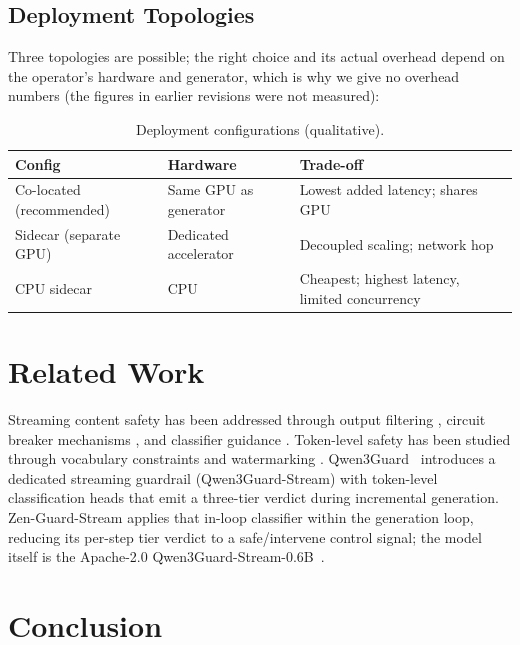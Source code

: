 \documentclass[11pt,a4paper]{article}
\begin{document}
\subsection{Deployment Topologies}

Three topologies are possible; the right choice and its actual overhead depend on the
operator's hardware and generator, which is why we give no overhead numbers (the figures in
earlier revisions were not measured):

\begin{table}[H]
\centering
\caption{Deployment configurations (qualitative).}
\begin{tabular}{lll}
\toprule
\textbf{Config} & \textbf{Hardware} & \textbf{Trade-off} \\
\midrule
Co-located (recommended) & Same GPU as generator & Lowest added latency; shares GPU \\
Sidecar (separate GPU) & Dedicated accelerator & Decoupled scaling; network hop \\
CPU sidecar & CPU & Cheapest; highest latency, limited concurrency \\
\bottomrule
\end{tabular}
\end{table}

\section{Related Work}

Streaming content safety has been addressed through output filtering \cite{perspective}, circuit breaker mechanisms \cite{circuitbreaker}, and classifier guidance \cite{classifierguidance}. Token-level safety has been studied through vocabulary constraints \cite{vocabconstraint} and watermarking \cite{watermark}. Qwen3Guard~\cite{qwen3guard} introduces a dedicated streaming guardrail (Qwen3Guard-Stream) with token-level classification heads that emit a three-tier verdict during incremental generation. Zen-Guard-Stream applies that in-loop classifier within the generation loop, reducing its per-step tier verdict to a safe/intervene control signal; the model itself is the Apache-2.0 Qwen3Guard-Stream-0.6B~\cite{qwen3guard}.

\section{Conclusion}
\end{document}
